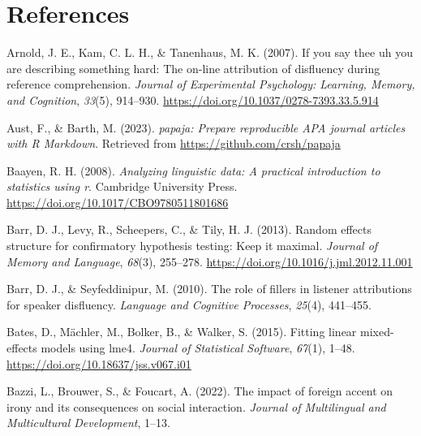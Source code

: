 \documentclass[
  man,floatsintext]{apa6}
\newlength{\cslhangindent}
\newlength{\cslentryspacingunit} %
\newenvironment{CSLReferences}[2] %
 {%
  \setlength{\parindent}{0pt}
  \ifodd #1
  \let\oldpar\par
  \def\par{\hangindent=\cslhangindent\oldpar}
  \fi
  \setlength{\parskip}{#2\cslentryspacingunit}
 }%
 {}
\begin{document}
\newpage

\hypertarget{references}{%
\section{References}\label{references}}

\hypertarget{refs}{}
\begin{CSLReferences}{1}{0}
\leavevmode{}%
Arnold, J. E., Kam, C. L. H., \& Tanenhaus, M. K. (2007). If you say thee uh you are describing something hard: The on-line attribution of disfluency during reference comprehension. \emph{Journal of Experimental Psychology: Learning, Memory, and Cognition}, \emph{33}(5), 914--930. \url{https://doi.org/10.1037/0278-7393.33.5.914}

\leavevmode{}%
Aust, F., \& Barth, M. (2023). \emph{{papaja}: {Prepare} reproducible {APA} journal articles with {R Markdown}}. Retrieved from \url{https://github.com/crsh/papaja}

\leavevmode{}%
Baayen, R. H. (2008). \emph{Analyzing linguistic data: A practical introduction to statistics using r}. Cambridge University Press. \url{https://doi.org/10.1017/CBO9780511801686}

\leavevmode{}%
Barr, D. J., Levy, R., Scheepers, C., \& Tily, H. J. (2013). Random effects structure for confirmatory hypothesis testing: Keep it maximal. \emph{Journal of Memory and Language}, \emph{68}(3), 255--278. \url{https://doi.org/10.1016/j.jml.2012.11.001}

\leavevmode{}%
Barr, D. J., \& Seyfeddinipur, M. (2010). The role of fillers in listener attributions for speaker disfluency. \emph{Language and Cognitive Processes}, \emph{25}(4), 441--455.

\leavevmode{}%
Bates, D., Mächler, M., Bolker, B., \& Walker, S. (2015). Fitting linear mixed-effects models using {lme4}. \emph{Journal of Statistical Software}, \emph{67}(1), 1--48. \url{https://doi.org/10.18637/jss.v067.i01}

\leavevmode{}%
Bazzi, L., Brouwer, S., \& Foucart, A. (2022). The impact of foreign accent on irony and its consequences on social interaction. \emph{Journal of Multilingual and Multicultural Development}, 1--13.


\end{CSLReferences}
\end{document}
